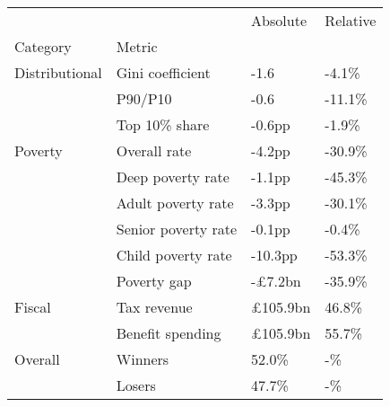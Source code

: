 \begin{tabular}{llll}
\toprule
        &        &  Absolute & Relative \\
Category & Metric &           &          \\
\midrule
Distributional & Gini coefficient &      -1.6 &    -4.1\% \\
        & P90/P10 &      -0.6 &   -11.1\% \\
        & Top 10\% share &    -0.6pp &    -1.9\% \\
Poverty & Overall rate &    -4.2pp &   -30.9\% \\
        & Deep poverty rate &    -1.1pp &   -45.3\% \\
        & Adult poverty rate &    -3.3pp &   -30.1\% \\
        & Senior poverty rate &    -0.1pp &    -0.4\% \\
        & Child poverty rate &   -10.3pp &   -53.3\% \\
        & Poverty gap &   -£7.2bn &   -35.9\% \\
Fiscal & Tax revenue &  £105.9bn &    46.8\% \\
        & Benefit spending &  £105.9bn &    55.7\% \\
Overall & Winners &     52.0\% &       -\% \\
        & Losers &     47.7\% &       -\% \\
\bottomrule
\end{tabular}
